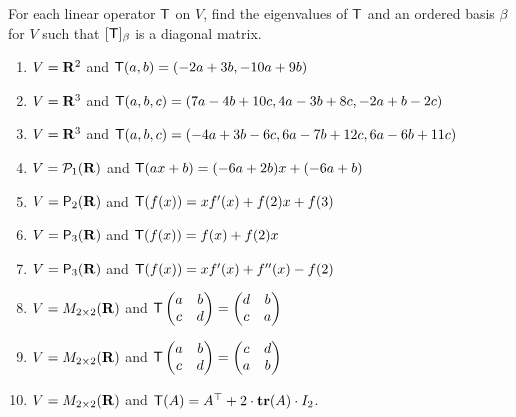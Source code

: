 \begin{exercise} \label{exercise 5.1.5}
For each linear operator \(\textsf{T}\) on \(V\), find the eigenvalues of \(\textsf{T}\) and an ordered basis \(\beta\) for \(V\) such that \([\textsf{T}]_{\beta}\) is a diagonal matrix.
\begin{enumerate}
\item \(V = \mathbf{R}^2\) and \(\textsf{T}(a, b) = (-2a + 3b, -10a + 9b)\)
\item \(V = \mathbf{R}^3\) and \(\textsf{T}(a, b, c) = (7a - 4b + 10c, 4a - 3b + 8c, -2a + b - 2c)\)
\item \(V = \mathbf{R}^3\) and \(\textsf{T}(a, b, c) = (-4a + 3b - 6c, 6a - 7b + 12c, 6a - 6b + 11c)\)
\item \(V = \mathcal{P}_1(\mathbf{R})\) and \(\textsf{T}(ax + b) = (-6a + 2b)x + (-6a + b)\)
\item \(V = \textsf{P}_2(\mathbf{R})\) and \(\textsf{T}(f(x)) = xf'(x) + f(2)x + f(3)\)
\item \(V = \textsf{P}_3(\mathbf{R})\) and \(\textsf{T}(f(x)) = f(x) + f(2)x\)
\item \(V = \textsf{P}_3(\mathbf{R})\) and \(\textsf{T}(f(x)) = xf'(x) + f''(x) - f(2)\)
\item \(V = M_{2 \times 2}(\mathbf{R})\) and \(\textsf{T} \begin{pmatrix} a & b \\ c & d \end{pmatrix} = \begin{pmatrix} d & b \\ c & a \end{pmatrix}\)
\item \(V = M_{2 \times 2}(\mathbf{R})\) and \(\textsf{T} \begin{pmatrix} a & b \\ c & d \end{pmatrix} = \begin{pmatrix} c & d \\ a & b \end{pmatrix}\)
\item \(V = M_{2 \times 2}(\mathbf{R})\) and \(\textsf{T}(A) = A^\top + 2 \cdot \textbf{tr}(A) \cdot I_2\).
\end{enumerate}
\end{exercise}

